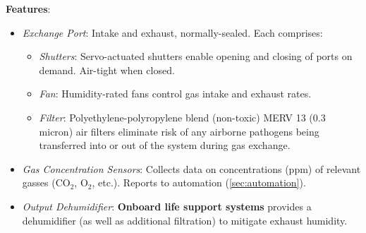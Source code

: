 \textbf{Features}:
\begin{itemize}
    \item \textit{Exchange Port}: Intake and exhaust, normally-sealed. Each comprises:
    \begin{itemize}
        \item \textit{Shutters}: Servo-actuated shutters enable opening and closing of ports on demand. Air-tight when closed.
        \item \textit{Fan}: Humidity-rated fans control gas intake and exhaust rates.
        \item \textit{Filter}: Polyethylene-polyropylene blend (non-toxic) MERV 13 (0.3 micron) air filters \cite{filter} eliminate risk of any airborne pathogens being transferred into or out of the system during gas exchange.
    \end{itemize}
    \item \textit{Gas Concentration Sensors}: Collects data on concentrations (ppm) of relevant gasses (CO${}_2$, O${}_2$, etc.). Reports to automation (\ref{sec:automation}).
    \item \textit{Output Dehumidifier}: \textbf{Onboard life support systems} provides a dehumidifier (as well as additional filtration) to mitigate exhaust humidity.
\end{itemize}